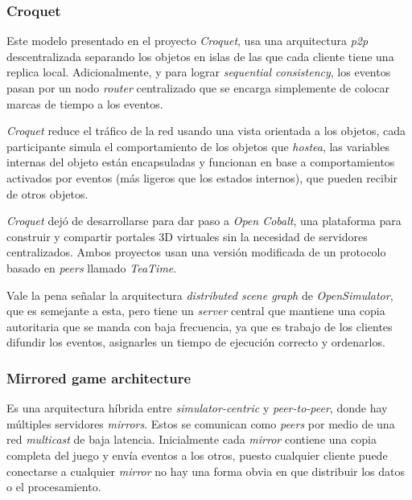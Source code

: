 \subsubsection{Croquet}

Este modelo presentado en el proyecto \emph{Croquet}, usa una arquitectura \emph{p2p} descentralizada separando los objetos en islas de las que cada cliente tiene una replica local. Adicionalmente, y para lograr \emph{sequential consistency}, los eventos pasan por un nodo \emph{router} centralizado que se encarga simplemente de colocar marcas de tiempo a los eventos.

\emph{Croquet} reduce el tráfico de la red usando una vista orientada a los objetos, cada participante simula el comportamiento de los objetos que \emph{hostea}, las variables internas del objeto están encapsuladas y funcionan en base a comportamientos activados por eventos (más ligeros que los estados internos), que pueden recibir de otros objetos.

\emph{Croquet} dejó de desarrollarse para dar paso a \emph{Open Cobalt}, una plataforma para construir y compartir portales 3D virtuales sin la necesidad de servidores centralizados. Ambos proyectos usan una versión modificada de un protocolo basado en \emph{peers} llamado \emph{TeaTime}.

Vale la pena señalar la arquitectura \emph{distributed scene graph} de \emph{OpenSimulator}, que es semejante a esta, pero tiene un \emph{server} central que mantiene una copia autoritaria que se manda con baja frecuencia, ya que es trabajo de los clientes difundir los eventos, asignarles un tiempo de ejecución correcto y ordenarlos.

\subsubsection{Mirrored game architecture}

Es una arquitectura híbrida entre \emph{simulator-centric} y \emph{peer-to-peer}, donde hay múltiples servidores \emph{mirrors}. Estos se comunican como \emph{peers} por medio de una red \emph{multicast} de baja latencia. Inicialmente cada \emph{mirror} contiene una copia completa del juego y envía eventos a los otros, puesto cualquier cliente puede conectarse a cualquier \emph{mirror} no hay una forma obvia en que distribuir los datos o el procesamiento.




